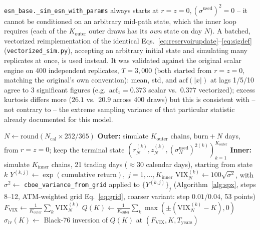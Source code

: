 \documentclass[11pt]{article}
\begin{document}
\begin{note}
\texttt{esn\_base.\_sim\_esn\_with\_params} always starts at
$r=z=0,(\sigma^{\text{used}})^2=0$ -- it cannot be conditioned on an
arbitrary mid-path state, which the inner loop requires (each of the
$K_{\text{outer}}$ outer draws has its \emph{own} state on day $N$).
A batched, vectorized reimplementation of the identical
Eqs.~\eqref{eq:reservoirupdate}--\eqref{eq:sigdef}
(\texttt{vectorized\_sim.py}), accepting an arbitrary initial state and
simulating many replicates at once, is used instead. It was validated
against the original scalar engine on 400 independent replicates,
$T=3{,}000$ (both started from $r=z=0$, matching the original's own
convention): mean, std, and $\mathrm{acf}(|x|)$ at lags 1/5/10 agree to
3 significant figures (e.g.\ $\mathrm{acf}_1=0.373$ scalar vs.\ $0.377$
vectorized); excess kurtosis differs more ($26.1$ vs.\ $20.9$ across
400 draws) but this is consistent with -- not contrary to -- the
extreme sampling variance of that particular statistic already
documented for this model.
\end{note}

\begin{algorithm}[H]
\caption{VIX-option smile at horizon $N_{\text{cal}}$ calendar days}
\label{alg:vix}
\begin{algorithmic}[1]
\State $N \gets \mathrm{round}(N_{\text{cal}}\times252/365)$
\State \textbf{Outer:} simulate $K_{\text{outer}}$ chains, $\mathrm{burn}+N$ days, from $r=z=0$; keep the terminal state $(r_N^{(k)},z_N^{(k)},(\sigma^{\text{used}}_N)^{2(k)})_{k=1}^{K_{\text{outer}}}$
    \State \textbf{Inner:} simulate $K_{\text{inner}}$ chains, 21 trading days ($\approx$30 calendar days), starting from state $k$
    \State $Y^{(k,j)} \gets \exp(\text{cumulative return}),\; j=1,\dots,K_{\text{inner}}$
    \State $\mathrm{VIX}_N^{(k)} \gets 100\sqrt{\sigma^2}$, with $\sigma^2\gets$ \texttt{cboe\_variance\_from\_grid} applied to $\{Y^{(k,j)}\}_j$ (Algorithm~\ref{alg:spx}, steps 8--12, ATM-weighted grid Eq.~\eqref{eq:grid}, coarser variant: step $0.01$/$0.04$, 53 points)
\EndFor
\State $F_{\text{VIX}} \gets \frac{1}{K_{\text{outer}}}\sum_k \mathrm{VIX}_N^{(k)}$ 
    \State $Q(K) \gets \frac{1}{K_{\text{outer}}}\sum_k \max(\pm(\mathrm{VIX}_N^{(k)}-K),0)$ 
    \State $\widehat\sigma_{\text{iv}}(K) \gets$ Black-76 inversion of $Q(K)$ at $(F_{\text{VIX}},K,T_{\text{years}})$
\EndFor
\end{algorithmic}
\end{algorithm}
\end{document}
